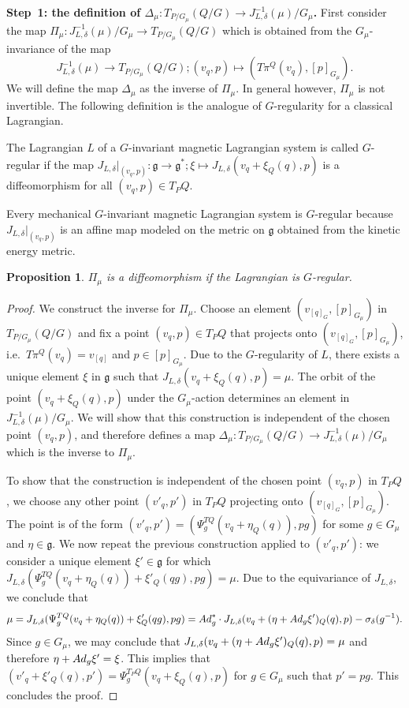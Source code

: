 \documentclass[11pt]{article}
\newtheorem{proposition}{Proposition}
\newcommand{\lag}{\mathfrak{g}}
\begin{document}
{\bf Step~1: the def\/inition of $\Delta_\mu: T_{P/G_\mu}(Q/G)\to J^{-1}_{L,\delta}(\mu)/G_\mu$.}
First consider the map $\Pi_\mu:J^{-1}_{L,\delta}(\mu)/G_\mu\to T_{P/G_\mu} (Q/G)$ which is obtained from the $G_\mu$-invariance of the map \[J^{-1}_{L,\delta}(\mu)\to T_{P/G_\mu}(Q/G); (v_q,p) \mapsto (T\pi^Q(v_q),[p]_{G_\mu}).\] We will def\/ine the map $\Delta_\mu$ as the inverse of  $\Pi_\mu$. In general however, $\Pi_\mu$ is not invertible. The following def\/inition is the analogue of $G$-regularity for a classical Lagrangian.

\begin{definition} The Lagrangian $L$ of a $G$-invariant magnetic Lagrangian system is called $G$-regular if the map $J_{L,\delta}|_{(v_q,p)}: \lag \to \lag^*; \xi \mapsto J_{L,\delta}(v_q +\xi_Q(q),p) $ is a dif\/feomorphism for all $(v_q,p)\in T_PQ$.
\end{definition}
Every mechanical $G$-invariant magnetic Lagrangian system is $G$-regular because $J_{L,\delta}|_{(v_q,p)}$ is an af\/f\/ine map modeled on the metric on $\lag$ obtained from the kinetic energy metric.

\begin{proposition}\label{prop:gregular} $\Pi_\mu$ is a diffeomorphism if the Lagrangian is $G$-regular.  \end{proposition}
\begin{proof}
We construct the inverse for $\Pi_\mu$. Choose an element $(v_{[q]_G},[p]_{G_\mu})$ in $T_{P/G_\mu}(Q/G)$ and f\/ix a point $(v_q,p)\in T_PQ$ that projects onto $(v_{[q]_G},[p]_{G_\mu})$, i.e.\ $T\pi^Q(v_q)=v_{[q]}$ and $p\in[p]_{G_\mu}$. Due to the $G$-regularity of $L$, there exists a unique element $\xi$ in $\lag$ such that $J_{L,\delta}(v_q +\xi_Q(q),p) = \mu$. The orbit of the point $(v_q+\xi_Q(q),p)$ under the $G_\mu$-action determines an element in $J_{L,\delta}^{-1}(\mu)/G_\mu$. We will show that this construction is independent of the chosen point $(v_q,p)$, and therefore def\/ines a map $\Delta_\mu: T_{P/G_\mu} (Q/G)\to J^{-1}_{L,\delta}(\mu)/G_\mu$ which is the inverse to $\Pi_\mu$.

To show that the construction is independent of the chosen point $(v_q,p)$ in $T_PQ$, we choose any other point $(v'_q,p')$ in $T_PQ$ projecting onto $(v_{[q]_G},[p]_{G_\mu})$. The point is of the form $(v'_q,p')=(\Psi^{TQ}_g(v_q+\eta_Q(q)),pg)$ for some $g\in G_\mu$ and $\eta\in\lag$. We now repeat the previous  construction applied to $(v'_q,p')$: we consider a unique element $\xi'\in\lag$ for which $J_{L,\delta}(\Psi^{TQ}_g(v_q+\eta_Q(q)) +\xi'_Q(qg),pg) = \mu$. Due to the equivariance of $J_{L,\delta}$, we conclude that
\begin{gather*}
\mu = J_{L,\delta}(\Psi^{TQ}_g(v_q+\eta_Q(q)) +\xi'_Q(qg),pg) ={\rm Ad}_g^*\cdot J_{L,\delta}(v_q+(\eta+{\rm Ad}_g\xi')_Q(q),p) -\sigma_\delta(g^{-1}).
 \end{gather*}
 Since $g\in G_\mu$, we may conclude that $J_{L,\delta}(v_q+(\eta+{\rm Ad}_g\xi')_Q(q),p)=\mu$ and therefore $\eta+{\rm Ad}_g\xi' = \xi$. This implies that $(v'_q+\xi'_Q(q),p')=\Psi^{T_PQ}_g(v_q+\xi_Q(q),p)$ for $g\in G_\mu$ such that $p'=pg$. This concludes the proof.
\end{proof}
\end{document}
